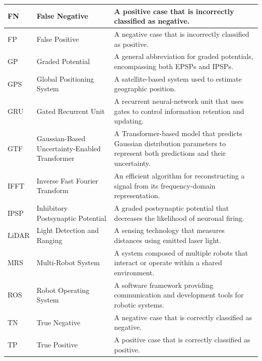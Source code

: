 \documentclass[a4paper]{article}
\begin{document}
\begin{table}[H]
\begin{tabular}{p{} p{} p{}}
FN
& False Negative
& A positive case that is incorrectly classified as negative. \\
\hline

FP
& False Positive
& A negative case that is incorrectly classified as positive. \\
\hline

GP
& Graded Potential
& A general abbreviation for graded potentials, encompassing both EPSPs and IPSPs. \\
\hline

GPS
& Global Positioning System
& A satellite-based system used to estimate geographic position. \\
\hline

GRU
& Gated Recurrent Unit
& A recurrent neural-network unit that uses gates to control information retention and updating. \\
\hline

GTF
& Gaussian-Based Uncertainty-Enabled Transformer
& A Transformer-based model that predicts Gaussian distribution parameters to represent both predictions and their uncertainty. \\
\hline

IFFT
& Inverse Fast Fourier Transform
& An efficient algorithm for reconstructing a signal from its frequency-domain representation. \\
\hline

IPSP
& Inhibitory Postsynaptic Potential
& A graded postsynaptic potential that decreases the likelihood of neuronal firing. \\
\hline

LiDAR
& Light Detection and Ranging
& A sensing technology that measures distances using emitted laser light. \\
\hline

MRS
& Multi-Robot System
& A system composed of multiple robots that interact or operate within a shared environment. \\
\hline

ROS
& Robot Operating System
& A software framework providing communication and development tools for robotic systems. \\
\hline

TN
& True Negative
& A negative case that is correctly classified as negative. \\
\hline

TP
& True Positive
& A positive case that is correctly classified as positive. \\
\hline


\end{tabular}
\end{table}
\end{document}
